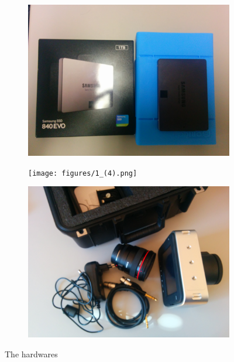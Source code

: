 \documentclass[[12pt,DIV14,BCOR12mm,a4paper,footexclude,headinclude,halfparskip-,twoside,openright,cleardoubleempty,idxtotoc,bibtotoc]{article}
\begin{document}
\begin{figure}[ht]
	\begin{subfigure}[b]{0.30\textwidth}
	      \includegraphics[width=\textwidth]{figures/n3.jpg}
	      \caption{}
		\label{fig_hw_d}
	\end{subfigure}
	\begin{subfigure}[b]{0.30\textwidth}
	      \texttt{[image: figures/1\_(4).png]}
	      \caption{}
		\label{fig_hw_e}
	\end{subfigure}
	\begin{subfigure}[b]{0.30\textwidth}
	      \includegraphics[width=\textwidth]{figures/1_(2).jpg}
	      \caption{}
		\label{fig_hw_f}
	\end{subfigure}
	\caption{The hardwares}
	\label{fig_hw}
\end{figure}
\end{document}
